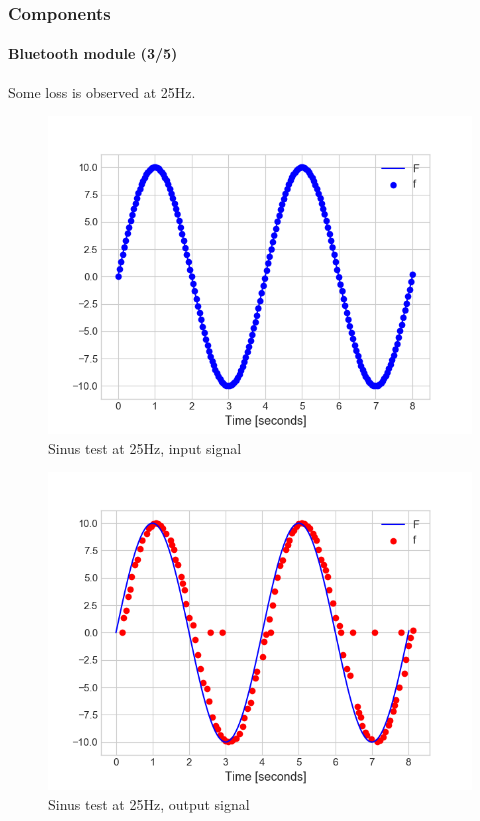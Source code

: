 \documentclass[10pt]{beamer}
\begin{document}

\begin{frame}
\frametitle{Components}
\framesubtitle{Bluetooth module (3/5)}
Some loss is observed at 25Hz.
\begin{multicols}{2}
\begin{figure}
\centering
\includegraphics[scale=0.4]{figures/sending-25hz.png}
\caption{Sinus test at 25Hz, input signal}
\label{fig:sinus-i-25}
\end{figure}
\columnbreak
\begin{figure}
\centering
\includegraphics[scale=0.4]{figures/reception-25hz.png}
\caption{Sinus test at 25Hz, output signal}
\label{fig:sinus-o-25}
\end{figure}
\end{multicols}
\end{frame}
\end{document}
